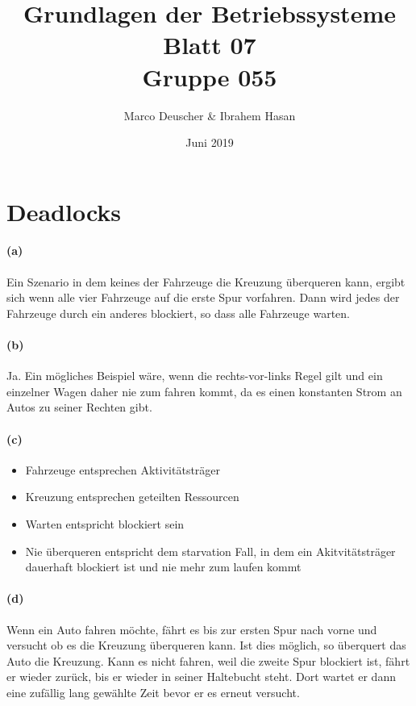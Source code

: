 \documentclass[a4paper]{article}
\title{Grundlagen der Betriebssysteme\\ Blatt 07 \\ Gruppe 055}
\author{Marco Deuscher & Ibrahem Hasan}
\date{Juni 2019}
\begin{document}
\maketitle

\section{Deadlocks}
\paragraph{(a)}
Ein Szenario in dem keines der Fahrzeuge die Kreuzung überqueren kann, ergibt sich wenn alle vier Fahrzeuge auf die erste Spur vorfahren. Dann wird jedes der Fahrzeuge durch ein anderes blockiert, so dass alle Fahrzeuge warten.\\

\paragraph{(b)}
Ja. Ein mögliches Beispiel wäre, wenn die rechts-vor-links Regel gilt und ein einzelner Wagen daher nie zum fahren kommt, da es einen konstanten Strom an Autos zu seiner Rechten gibt.

\paragraph{(c)}
\begin{itemize}
    \item Fahrzeuge entsprechen Aktivitätsträger
    \item Kreuzung entsprechen geteilten Ressourcen
    \item Warten entspricht blockiert sein
    \item Nie überqueren entspricht dem starvation Fall, in dem ein Akitvitätsträger dauerhaft blockiert ist und nie mehr zum laufen kommt
\end{itemize}

\paragraph{(d)}
Wenn ein Auto fahren möchte, fährt es bis zur ersten Spur nach vorne und versucht ob es die Kreuzung überqueren kann. Ist dies möglich, so überquert das Auto die Kreuzung. Kann es nicht fahren, weil die zweite Spur blockiert ist, fährt er wieder zurück, bis er wieder in seiner Haltebucht steht. Dort wartet er dann eine zufällig lang gewählte Zeit bevor er es erneut versucht.
\end{document}
